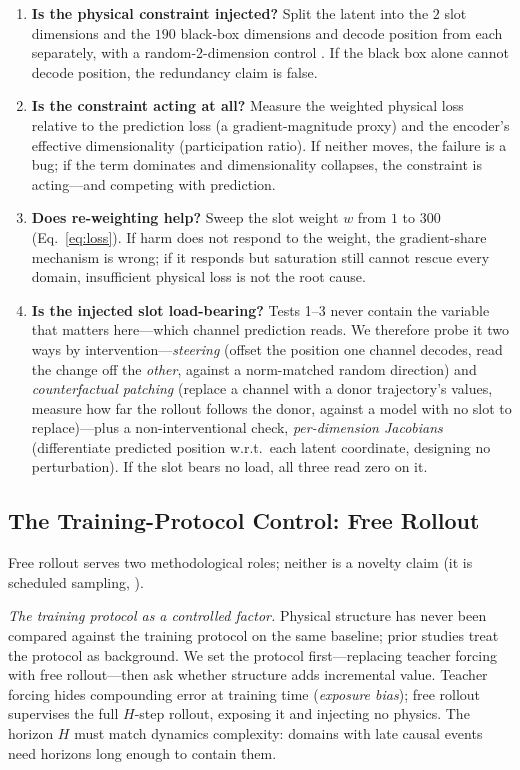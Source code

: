 \begin{enumerate}
    \item \textbf{Is the physical constraint injected?} Split the latent into the $2$ slot dimensions and the $190$ black-box dimensions and decode position from each separately, with a random-2-dimension control \citep{hewitt2019control}. If the black box alone cannot decode position, the redundancy claim is false.
    \item \textbf{Is the constraint acting at all?} Measure the weighted physical loss relative to the prediction loss (a gradient-magnitude proxy) and the encoder's effective dimensionality (participation ratio). If neither moves, the failure is a bug; if the term dominates and dimensionality collapses, the constraint is acting---and competing with prediction.
    \item \textbf{Does re-weighting help?} Sweep the slot weight $w$ from $1$ to $300$ (Eq.~\ref{eq:loss}). If harm does not respond to the weight, the gradient-share mechanism is wrong; if it responds but saturation still cannot rescue every domain, insufficient physical loss is not the root cause.
    \item \textbf{Is the injected slot load-bearing?} Tests 1--3 never contain the variable that matters here---which channel prediction reads. We therefore probe it two ways by intervention---\emph{steering} (offset the position one channel decodes, read the change off the \emph{other}, against a norm-matched random direction) and \emph{counterfactual patching} (replace a channel with a donor trajectory's values, measure how far the rollout follows the donor, against a model with no slot to replace)---plus a non-interventional check, \emph{per-dimension Jacobians} (differentiate predicted position w.r.t.\ each latent coordinate, designing no perturbation). If the slot bears no load, all three read zero on it.
\end{enumerate}

\subsection{The Training-Protocol Control: Free Rollout}
\label{sec:protocol}

Free rollout serves two methodological roles; neither is a novelty claim (it is scheduled sampling, \citealp{bengio2015scheduled}).

\emph{The training protocol as a controlled factor.} Physical structure has never been compared against the training protocol on the same baseline; prior studies treat the protocol as background. We set the protocol first---replacing teacher forcing with free rollout---then ask whether structure adds incremental value. Teacher forcing hides compounding error at training time (\emph{exposure bias}); free rollout supervises the full $H$-step rollout, exposing it and injecting no physics. The horizon $H$ must match dynamics complexity: domains with late causal events need horizons long enough to contain them.

